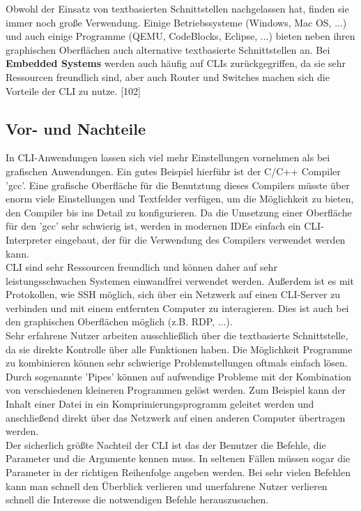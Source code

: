 \documentclass[12pt,a4paper]{report}
\begin{document}
\begin{onehalfspace}
Obwohl der Einsatz von textbasierten Schnittstellen nachgelassen hat, finden sie immer noch große Verwendung. Einige Betriebssysteme (Windows, Mac OS, ...) und auch einige Programme (QEMU, CodeBlocks, Eclipse, ...) bieten neben ihren graphischen Oberflächen auch alternative textbasierte Schnittstellen an. Bei \textbf{Embedded Systems} werden auch häufig auf CLIs zurückgegriffen, da sie sehr Ressourcen freundlich sind, aber auch Router und Switches machen sich die Vorteile der CLI zu nutze. [102]

\subsection{Vor- und Nachteile}

In CLI-Anwendungen lassen sich viel mehr Einstellungen vornehmen als bei grafischen Anwendungen. Ein gutes Beispiel hierführ ist der C/C++ Compiler 'gcc'. Eine grafische Oberfläche für die Benutztung dieses Compilers müsste über enorm viele Einstellungen und Textfelder verfügen, um die Möglichkeit zu bieten, den Compiler bis ins Detail zu konfigurieren. Da die Umsetzung einer Oberfläche für den 'gcc' sehr schwierig ist, werden in modernen IDEs einfach ein CLI-Interpreter eingebaut, der für die Verwendung des Compilers verwendet werden kann.\\

CLI sind sehr Ressourcen freundlich und können daher auf sehr leistungsschwachen Systemen einwandfrei verwendet werden. Außerdem ist es mit Protokollen, wie SSH möglich, sich über ein Netzwerk auf einen CLI-Server zu verbinden und mit einem entfernten Computer zu interagieren. Dies ist auch bei den graphischen Oberflächen möglich (z.B. RDP, ...).\\

Sehr erfahrene Nutzer arbeiten ausschließlich über die textbasierte Schnittstelle, da sie direkte Kontrolle über alle Funktionen haben. Die Möglichkeit Programme zu kombinieren können sehr schwierige Problemstellungen oftmals einfach lösen. Durch sogenannte 'Pipes' können auf aufwendige Probleme mit der Kombination von verschiedenen kleineren Programmen gelöst werden. Zum Beispiel kann der Inhalt einer Datei in ein Komprimierungsprogramm geleitet werden und anschließend direkt über das Netzwerk auf einen anderen Computer übertragen werden.\\

Der sicherlich größte Nachteil der CLI ist das der Benutzer die Befehle, die Parameter und die Argumente kennen muss. In seltenen Fällen müssen sogar die Parameter in der richtigen Reihenfolge angeben werden. Bei sehr vielen Befehlen kann man schnell den Überblick verlieren und unerfahrene Nutzer verlieren schnell die Interesse die notwendigen Befehle herauszusuchen.\\


\end{onehalfspace}
\end{document}
